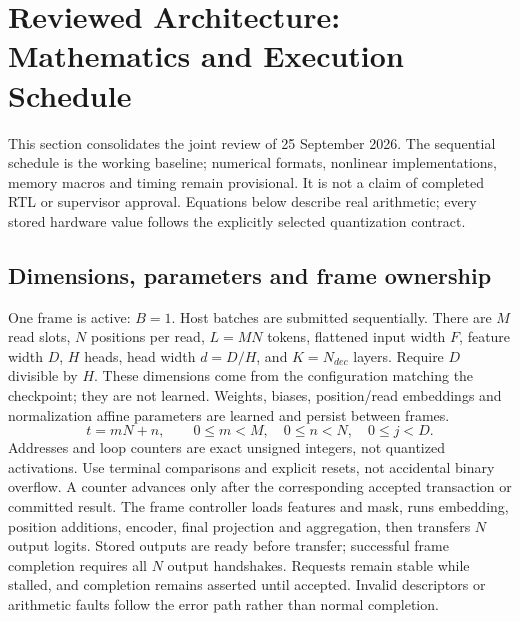 \documentclass[11pt,a4paper]{article}
\begin{document}
\section{Reviewed Architecture: Mathematics and Execution Schedule}
This section consolidates the joint review of 25 September 2026. The sequential schedule is the working baseline; numerical formats, nonlinear implementations, memory macros and timing remain provisional. It is not a claim of completed RTL or supervisor approval. Equations below describe real arithmetic; every stored hardware value follows the explicitly selected quantization contract.

\subsection{Dimensions, parameters and frame ownership}
One frame is active: $B=1$. Host batches are submitted sequentially. There are $M$ read slots, $N$ positions per read, $L=MN$ tokens, flattened input width $F$, feature width $D$, $H$ heads, head width $d=D/H$, and $K=N_{dec}$ layers. Require $D$ divisible by $H$. These dimensions come from the configuration matching the checkpoint; they are not learned. Weights, biases, position/read embeddings and normalization affine parameters are learned and persist between frames.
\[
t=mN+n,\qquad 0\leq m<M,\quad 0\leq n<N,\quad 0\leq j<D.
\]
Addresses and loop counters are exact unsigned integers, not quantized activations. Use terminal comparisons and explicit resets, not accidental binary overflow. A counter advances only after the corresponding accepted transaction or committed result.
The frame controller loads features and mask, runs embedding, position additions, encoder, final projection and aggregation, then transfers $N$ output logits. Stored outputs are ready before transfer; successful frame completion requires all $N$ output handshakes. Requests remain stable while stalled, and completion remains asserted until accepted. Invalid descriptors or arithmetic faults follow the error path rather than normal completion.
\end{document}

